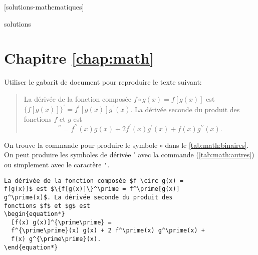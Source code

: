 [solutions-mathematiques]

\begin{Filesave}{solutions}
\section*{Chapitre \ref*{chap:math}}

\end{Filesave}

\begin{exercice}
  Utiliser le gabarit de document  pour
  reproduire le texte suivant:
  \begin{quote}
    La dérivée de la fonction composée $f \circ g(x) = f[g(x)]$ est
    $\{f[g(x)]\}^\prime = f^\prime[g(x)] g^\prime(x)$. La dérivée
    seconde du produit des fonctions $f$ et $g$ est
    \begin{equation*}
      [f(x) g(x)]^{\prime\prime} =
      f^{\prime\prime}(x) g(x) + 2 f^\prime(x) g^\prime(x) +
      f(x) g^{\prime\prime}(x).
    \end{equation*}
  \end{quote}
  \begin{sol}
    On trouve la commande pour produire le symbole $\circ$ dans le
    \autoref{tab:math:binaires}. On peut produire les symboles de
    dérivée $\prime$ avec la commande \cmd{\prime}
    (\autoref{tab:math:autres}) ou simplement avec le caractère
    \verb='=.
\begin{lstlisting}
La dérivée de la fonction composée $f \circ g(x) =
f[g(x)]$ est $\{f[g(x)]\}^\prime = f^\prime[g(x)]
g^\prime(x)$. La dérivée seconde du produit des
fonctions $f$ et $g$ est
\begin{equation*}
  [f(x) g(x)]^{\prime\prime} =
  f^{\prime\prime}(x) g(x) + 2 f^\prime(x) g^\prime(x) +
  f(x) g^{\prime\prime}(x).
\end{equation*}
\end{lstlisting}
  \end{sol}
\end{exercice}

